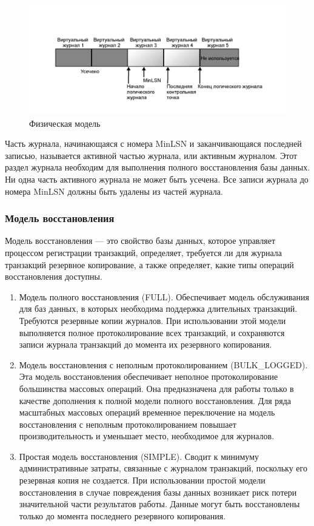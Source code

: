 \begin{figure}[ht!]
	\centering
	\includegraphics[width=18cm, keepaspectratio]{assets/physics.png}
	\caption{Физическая модель} 
\end{figure}
\FloatBarrier

Часть журнала, начинающаяся с номера MinLSN и заканчивающаяся
последней записью,
называется активной частью журнала, или активным журналом. Этот
раздел журнала
необходим для выполнения полного восстановления базы данных. Ни одна
часть
активного журнала не может быть усечена. Все записи журнала до номера
MinLSN
должны быть удалены из частей журнала.

\subsubsection{Модель восстановления}

Модель восстановления --- это свойство базы данных, которое управляет процессом регистрации транзакций, определяет, требуется ли для журнала транзакций резервное копирование, а также определяет, какие типы операций восстановления доступны.

\begin{enumerate}
	\item Модель полного восстановления (FULL). Обеспечивает модель обслуживания для баз данных, в которых 
	необходима поддержка длительных транзакций. Требуются резервные копии журналов. При использовании этой 
	модели выполняется полное протоколирование всех транзакций, и сохраняются записи журнала транзакций до 
	момента их резервного копирования.
	\item Модель восстановления с неполным протоколированием (BULK\_LOGGED). Эта модель восстановления 
	обеспечивает неполное протоколирование большинства массовых операций. Она предназначена для работы только в 
	качестве дополнения к полной модели полного восстановления. Для ряда масштабных массовых операций временное переключение на модель восстановления с неполным протоколированием повышает производительность и уменьшает место, необходимое для журналов.
	\item Простая модель восстановления (SIMPLE). Сводит к минимуму административные затраты, связанные с 
	журналом транзакций, поскольку его резервная копия не создается. При использовании простой модели 
	восстановления в случае повреждения базы данных возникает риск потери значительной части результатов работы. 
	Данные могут быть восстановлены только до момента последнего резервного копирования.
\end{enumerate}

